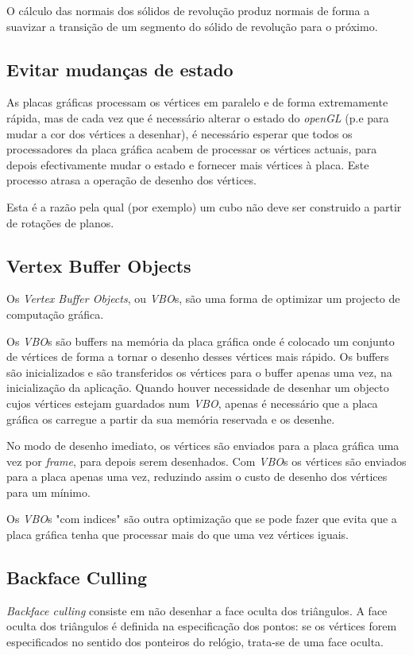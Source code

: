 \documentclass[a5paper,onecolumn, 11pt]{article}
\begin{document}
O cálculo das normais dos sólidos de revolução produz normais de forma a suavizar a transição de um segmento do sólido de revolução para o próximo.

\clearpage
\subsection{Evitar mudanças de estado} \label{evitar mudancas de estado}
As placas gráficas processam os vértices em paralelo e de forma extremamente rápida, mas de cada vez que é necessário alterar o estado do \textit{openGL} (p.e para mudar a cor dos vértices a desenhar), é necessário esperar que todos os processadores da placa gráfica acabem de processar os vértices actuais, para depois efectivamente mudar o estado e fornecer mais vértices à placa. Este processo atrasa a operação de desenho dos vértices.

Esta é a razão pela qual (por exemplo) um cubo não deve ser construido a partir de rotações de planos.

\subsection{Vertex Buffer Objects} \label{VBO}
Os \textit{Vertex Buffer Objects}, ou \textit{VBO}s, são uma forma de optimizar um projecto de computação gráfica.

Os \textit{VBO}s são buffers na memória da placa gráfica onde é colocado um conjunto de vértices de forma a tornar o desenho desses vértices mais rápido. Os buffers são inicializados e são transferidos os vértices para o buffer apenas uma vez, na inicialização da aplicação. Quando houver necessidade de desenhar um objecto cujos vértices estejam guardados num \textit{VBO}, apenas é necessário que a placa gráfica os carregue a partir da sua memória reservada e os desenhe.

No modo de desenho imediato, os vértices são enviados para a placa gráfica uma vez por \textit{frame}, para depois serem desenhados. Com \textit{VBO}s os vértices são enviados para a placa apenas uma vez, reduzindo assim o custo de desenho dos vértices para um mínimo.

Os \textit{VBO}s "com indices" são outra optimização que se pode fazer que evita que a placa gráfica tenha que processar mais do que uma vez vértices iguais.

\subsection{Backface Culling} \label{backfaceCulling}
\textit{Backface culling} consiste em não desenhar a face oculta dos triângulos. A face oculta dos triângulos é definida na especificação dos pontos: se os vértices forem especificados no sentido dos ponteiros do relógio, trata-se de uma face oculta.
\end{document}
